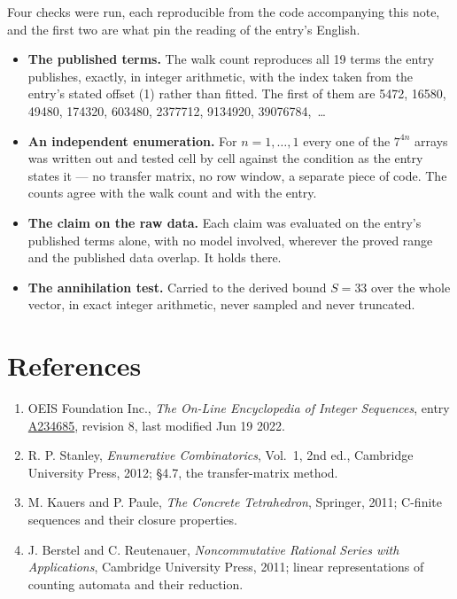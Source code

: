 \documentclass[11pt]{article}
\theoremstyle{definition}
\begin{document}
Four checks were run, each reproducible from the code accompanying this note, and the first two are what pin the reading of the entry's English.

\begin{itemize}

\item {\bfseries The published terms.} The walk count reproduces all 19 terms the entry publishes, exactly, in integer arithmetic, with the index taken from the entry's stated offset (1) rather than fitted. The first of them are 5472, 16580, 49480, 174320, 603480, 2377712, 9134920, 39076784,~\dots

\item {\bfseries An independent enumeration.} For $n = 1,\dots,1$ every one of the $7^{4n}$ arrays was written out and tested cell by cell against the condition as the entry states it --- no transfer matrix, no row window, a separate piece of code. The counts agree with the walk count and with the entry.

\item {\bfseries The claim on the raw data.} Each claim was evaluated on the entry's published terms alone, with no model involved, wherever the proved range and the published data overlap. It holds there.

\item {\bfseries The annihilation test.} Carried to the derived bound $S = 33$ over the whole vector, in exact integer arithmetic, never sampled and never truncated.

\end{itemize}

\section{References}

\begin{enumerate}

\item OEIS Foundation Inc., \emph{The On-Line Encyclopedia of Integer Sequences}, entry \href{https://oeis.org/A234685}{A234685}, revision 8, last modified Jun 19 2022.

\item R. P. Stanley, \emph{Enumerative Combinatorics}, Vol.~1, 2nd ed., Cambridge University Press, 2012; \S4.7, the transfer-matrix method.

\item M. Kauers and P. Paule, \emph{The Concrete Tetrahedron}, Springer, 2011; C-finite sequences and their closure properties.

\item J. Berstel and C. Reutenauer, \emph{Noncommutative Rational Series with Applications}, Cambridge University Press, 2011; linear representations of counting automata and their reduction.

\end{enumerate}
\end{document}
